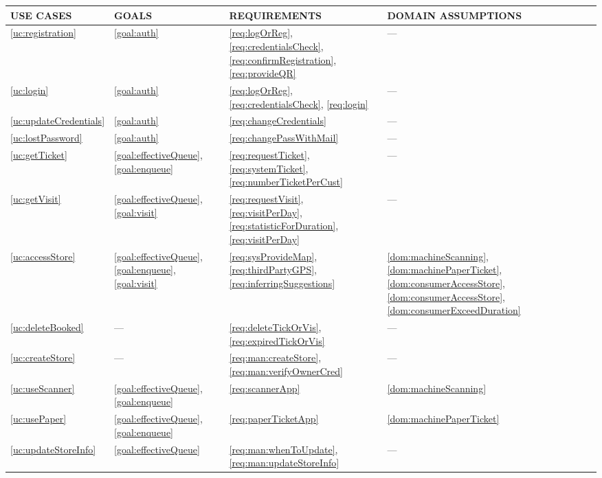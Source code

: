 \documentclass[a4paper, 12pt, oneside]{article}
\begin{document}
\begin{tabularx}{\linewidth}{| p{20mm} | p{20mm} | p{35mm} | p{50mm} |}

     \hline
	USE CASES & GOALS & REQUIREMENTS & DOMAIN ASSUMPTIONS \\
	 \hline
	\ref{uc:registration} & \ref{goal:auth} & \ref{req:logOrReg}, \ref{req:credentialsCheck}, \ref{req:confirmRegistration}, \ref{req:provideQR}  & ---\\
	
	 \hline
	\ref{uc:login} & \ref{goal:auth} & \ref{req:logOrReg}, \ref{req:credentialsCheck}, \ref{req:login} & --- \\
	
	\hline
	\ref{uc:updateCredentials} & \ref{goal:auth} & \ref{req:changeCredentials} & --- \\

	\hline
	\ref{uc:lostPassword} & \ref{goal:auth} & \ref{req:changePassWithMail} & --- \\
	
	\hline
	\ref{uc:getTicket} & \ref{goal:effectiveQueue}, \ref{goal:enqueue} & \ref{req:requestTicket}, \ref{req:systemTicket}, \ref{req:numberTicketPerCust} & --- \\
	\hline
	
	\ref{uc:getVisit} & \ref{goal:effectiveQueue}, \ref{goal:visit} & \ref{req:requestVisit}, \ref{req:visitPerDay}, \ref{req:statisticForDuration}, \ref{req:visitPerDay} & --- \\
	\hline
	
	\ref{uc:accessStore} & \ref{goal:effectiveQueue}, \ref{goal:enqueue}, \ref{goal:visit} & \ref{req:sysProvideMap}, \ref{req:thirdPartyGPS}, \ref{req:inferringSuggestions} & \ref{dom:machineScanning}, \ref{dom:machinePaperTicket}, \ref{dom:consumerAccessStore}, \ref{dom:consumerAccessStore}, \ref{dom:consumerExceedDuration} \\
	\hline
	
	\ref{uc:deleteBooked} & --- & \ref{req:deleteTickOrVis}, \ref{req:expiredTickOrVis} & --- \\
    \hline
    
    \ref{uc:createStore} & --- & \ref{req:man:createStore}, \ref{req:man:verifyOwnerCred} & --- \\
    \hline
    
    \ref{uc:useScanner} & \ref{goal:effectiveQueue}, \ref{goal:enqueue} & \ref{req:scannerApp} & \ref{dom:machineScanning}\\
    \hline
    
    \ref{uc:usePaper} & \ref{goal:effectiveQueue}, \ref{goal:enqueue} & \ref{req:paperTicketApp} & \ref{dom:machinePaperTicket}\\
    \hline
    
    \ref{uc:updateStoreInfo} & \ref{goal:effectiveQueue} & \ref{req:man:whenToUpdate}, \ref{req:man:updateStoreInfo} & --- \\
    \hline
    
\end{tabularx}
\end{document}
